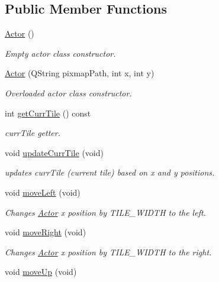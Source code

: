 \subsection*{Public Member Functions}
\begin{DoxyCompactItemize}
\item 
\mbox{\hyperlink{class_actor_a2a0ff4335a1ee9096df90f288c026c8b}{Actor}} ()
\begin{DoxyCompactList}\small\item\em Empty actor class constructor. \end{DoxyCompactList}\item 
\mbox{\hyperlink{class_actor_a651899b4ab39be662d785c298a2a2fae}{Actor}} (Q\+String pixmap\+Path, int x, int y)
\begin{DoxyCompactList}\small\item\em Overloaded actor class constructor. \end{DoxyCompactList}\item 
int \mbox{\hyperlink{class_actor_aa24a5fe0a46ca8274d993f7fe2954aa5}{get\+Curr\+Tile}} () const
\begin{DoxyCompactList}\small\item\em curr\+Tile getter. \end{DoxyCompactList}\item 
void \mbox{\hyperlink{class_actor_a0e9374b0779e9b79af21278a4698a138}{update\+Curr\+Tile}} (void)
\begin{DoxyCompactList}\small\item\em updates curr\+Tile (current tile) based on x and y positions. \end{DoxyCompactList}\item 
void \mbox{\hyperlink{class_actor_a66e25276468e157b822c9df798eb3e6a}{move\+Left}} (void)
\begin{DoxyCompactList}\small\item\em Changes \mbox{\hyperlink{class_actor}{Actor}} x position by T\+I\+L\+E\+\_\+\+W\+I\+D\+TH to the left. \end{DoxyCompactList}\item 
void \mbox{\hyperlink{class_actor_a66a756cd694913854af20352d4f0bedd}{move\+Right}} (void)
\begin{DoxyCompactList}\small\item\em Changes \mbox{\hyperlink{class_actor}{Actor}} x position by T\+I\+L\+E\+\_\+\+W\+I\+D\+TH to the right. \end{DoxyCompactList}\item 
void \mbox{\hyperlink{class_actor_a096be226cbfb42f7595283703742da89}{move\+Up}} (void)

\end{DoxyCompactItemize}
